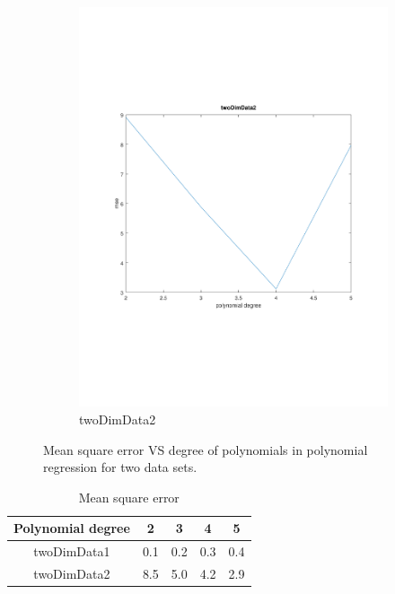 \documentclass[]{article}
\begin{document}
\begin{figure}[ht]
\begin{subfigure}{.49\textwidth}
	\includegraphics[trim= 10cm 5cm 10cm 5cm, scale=0.4]{proj1-4_1d-degree-data2}
	\caption{twoDimData2}
	\label{proj1-4_1d-degree-data2}
\end{subfigure}
\caption{Mean square error VS degree of polynomials in polynomial regression for two data sets.}
\label{fig:proj1-4_1d-degree}
\end{figure}

\ifx
\begin{table}[hb]
	\centering
	\caption{Mean square error}
	\label{tab:twodimData}
	\begin{tabular}{@{}ccccc@{}}
		\toprule
		Polynomial degree & 2   & 3   & 4   & 5   \\ \midrule
		twoDimData1       & 0.1 & 0.2 & 0.3 & 0.4 \\
		twoDimData2       & 8.5 & 5.0 & 4.2 & 2.9 \\ \bottomrule
	\end{tabular}
\end{table}
\fi
\end{document}
